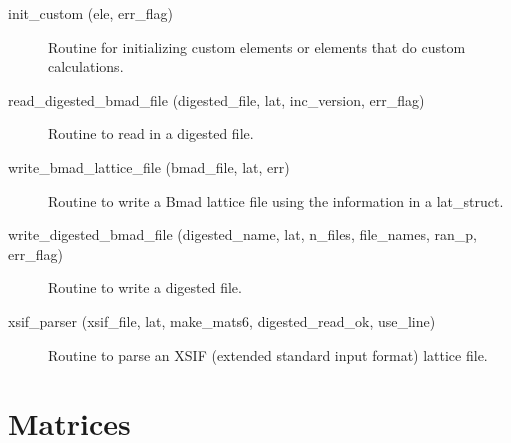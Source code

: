 \begin{description}
\label{r:init.custom}
\item[init_custom (ele, err_flag)] \Newline
Routine for initializing custom elements or elements that do custom
calculations.

\label{r:read.digested.bmad.file}
\item[read_digested_bmad_file (digested_file, lat, inc_version, err_flag)] \Newline
Routine to read in a digested file. 

\label{r:write.bmad.lattice.file}
\item[write_bmad_lattice_file (bmad_file, lat, err)] \Newline 
Routine to write a Bmad lattice file using the information in
a lat_struct.

\label{r:write.digested.bmad.file}
\item[write_digested_bmad_file (digested_name, lat, n_files, file_names, ran_p, err_flag)] \Newline
Routine to write a digested file. 

\label{r:xsif.parser}
\item[xsif_parser (xsif_file, lat, make_mats6, digested_read_ok, use_line)] \Newline 
     Routine to parse an XSIF (extended standard input format) lattice file.

\end{description}

\section{Matrices}
\label{r:mat}

